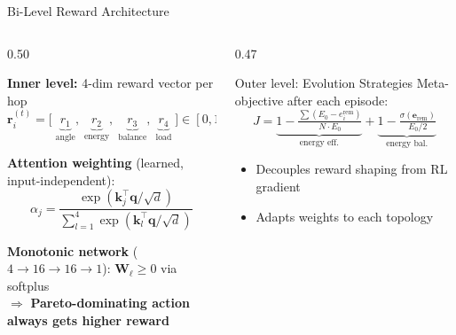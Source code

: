 \documentclass[aspectratio=169, 11pt]{beamer}
\begin{document}
\begin{frame}{Bi-Level Reward Architecture}
\vspace{-8pt}
\begin{columns}[T]
\begin{column}{0.50\textwidth}

  \textbf{Inner level:} 4-dim reward vector per hop
  \vspace{-6pt}
  \[
    \mathbf{r}_i^{(t)} = \bigl[\;\underbrace{r_1}_{\text{angle}},\;\underbrace{r_2}_{\text{energy}},\;\underbrace{r_3}_{\text{balance}},\;\underbrace{r_4}_{\text{load}}\;\bigr] \in [0,1]^4
  \]

  \vspace{-4pt}
  \textbf{Attention weighting} (learned, input-independent):
  \vspace{-6pt}
  \[
    \alpha_j = \frac{\exp(\mathbf{k}_j^\top \mathbf{q}/\sqrt{d})}{\sum_{l=1}^{4}\exp(\mathbf{k}_l^\top \mathbf{q}/\sqrt{d})}
  \]

  \vspace{-6pt}
  \textbf{Monotonic network} ($4 \!\to\! 16 \!\to\! 16 \!\to\! 1$):\;
  $\mathbf{W}_\ell \!\geq\! 0$ via softplus\\
  $\Rightarrow$ \textbf{Pareto-dominating action always gets higher reward}

\end{column}
\begin{column}{0.47\textwidth}

  \begin{block}{Outer level: Evolution Strategies}
    \vspace{-4pt}
    Meta-objective after each episode:
    \vspace{-6pt}
    {\small\[
      J = \underbrace{1 - \tfrac{\sum(E_0 - e_i^{\text{rem}})}{N \cdot E_0}}_{\text{energy eff.}} + \underbrace{1 - \tfrac{\sigma(\mathbf{e}_{\text{rem}})}{E_0/2}}_{\text{energy bal.}}
    \]}
    \vspace{-10pt}
    \begin{itemize}\setlength{\itemsep}{0pt}
      \item[$\to$] Decouples reward shaping from RL gradient
      \item[$\to$] Adapts weights to each topology
    \end{itemize}
  \end{block}


\end{column}
\end{columns}
\end{frame}
\end{document}
